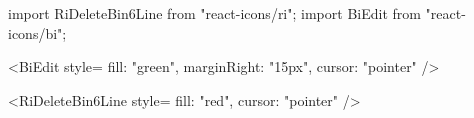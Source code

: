  import { RiDeleteBin6Line } from "react-icons/ri";
import { BiEdit } from "react-icons/bi";


 <BiEdit
        style={{ fill: "green", marginRight: "15px", cursor: "pointer" }}
/>
          
<RiDeleteBin6Line style={{ fill: "red", cursor: "pointer" }} />
        